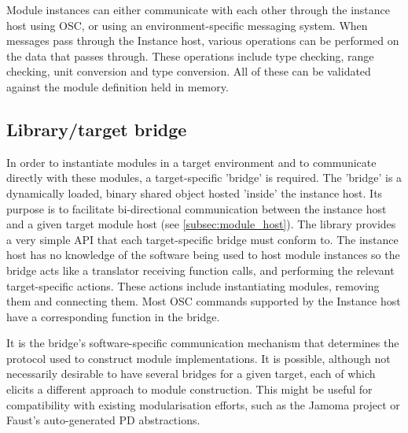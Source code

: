 \documentclass{article}
\begin{document}
Module instances can either communicate with each other through the instance host using OSC, or using an environment-specific messaging system. When messages pass through the Instance host, various operations can be performed on the data that passes through. These operations include type checking, range checking, unit conversion and type conversion. All of these can be validated against the module definition held in memory.
 
\subsection{Library/target bridge}\label{subsec:bridge}

In order to instantiate modules in a target environment and to communicate directly with these modules, a target-specific 'bridge' is required. The 'bridge' is a dynamically loaded, binary shared object hosted 'inside' the instance host. Its purpose is to facilitate bi-directional communication between the instance host and a given target module host (see \ref{subsec:module_host}). The library provides a very simple API that each target-specific bridge must conform to. The instance host has no knowledge of the software being used to host module instances so the bridge acts like a translator receiving function calls, and performing the relevant target-specific actions. These actions include instantiating modules, removing them and connecting them. Most OSC commands supported by the Instance host have a corresponding function in the bridge.

It is the bridge's software-specific communication mechanism that determines the protocol used to construct module implementations. It is possible, although not necessarily desirable to have several bridges for a given target, each of which elicits a different approach to module construction. This might be useful for compatibility with existing modularisation efforts, such as the Jamoma project or Faust's auto-generated PD abstractions.
\end{document}
